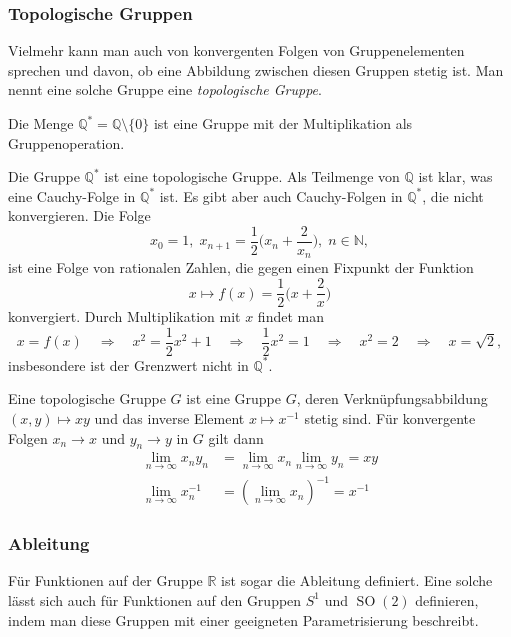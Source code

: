 %
%
\subsubsection{Topologische Gruppen}
Vielmehr kann man auch von konvergenten Folgen von Gruppenelementen
sprechen und davon, ob eine Abbildung zwischen diesen Gruppen
stetig ist.
Man nennt eine solche Gruppe eine {\em topologische Gruppe}.
%

\begin{beispiel}
Die Menge
\(
\mathbb{Q}^*
=
\mathbb{Q} \setminus\{0\}
\)
ist eine Gruppe mit der Multiplikation als Gruppenoperation.
\end{beispiel}

Die Gruppe $\mathbb{Q}^*$ ist eine topologische Gruppe.
Als Teilmenge von $\mathbb{Q}$ ist klar, was eine Cauchy-Folge in
$\mathbb{Q}^*$ ist.
Es gibt aber auch Cauchy-Folgen in $\mathbb{Q}^*$, die nicht konvergieren.
Die Folge
\[
x_0=1,\;
x_{n+1} = \frac12\biggl(x_n+\frac{2}{x_n}\biggr),\; n\in\mathbb{N},
\]
ist eine Folge von rationalen Zahlen, die gegen einen Fixpunkt der
Funktion
\[
x\mapsto f(x)=\frac12\biggl(x+\frac{2}{x}\biggr)
\]
konvergiert.
Durch Multiplikation mit $x$ findet man
\[
x=f(x)
\quad\Rightarrow\quad
x^2=\frac12 x^2 + 1
\quad\Rightarrow\quad
\frac12x^2=1
\quad\Rightarrow\quad
x^2=2
\quad\Rightarrow\quad
x=\sqrt{2},
\]
insbesondere ist der Grenzwert nicht in $\mathbb{Q}^*$.

\begin{definition}
\label{buch:gruppen:gruppe:def:topgruppe}
Eine topologische Gruppe $G$ ist eine Gruppe $G$, deren Verknüpfungsabbildung
$(x,y)\mapsto xy$ und das inverse Element $x\mapsto x^{-1}$ stetig sind.
Für konvergente Folgen $x_n\to x$ und $y_n\to y$ in $G$ gilt dann
\begin{align*}
\lim_{n\to \infty} x_ny_n &= \lim_{n\to\infty} x_n \lim_{n\to\infty} y_n = xy
\\
\lim_{n\to \infty} x_n^{-1} &= (\lim_{n\to\infty} x_n)^{-1} = x^{-1}
\end{align*}
\end{definition}

%
% 
%
\subsubsection{Ableitung}
Für Funktionen auf der Gruppe $\mathbb{R}$ ist sogar die Ableitung
definiert.
Eine solche lässt sich auch für Funktionen auf den Gruppen 
$S^1$ und $\operatorname{SO}(2)$ definieren, indem man diese Gruppen
mit einer geeigneten Parametrisierung beschreibt.



